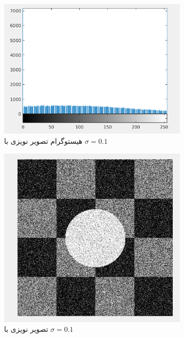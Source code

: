 \documentclass[11.5pt,a4paper]{article}
\begin{document}
\begin{figure}[h]
	\begin{subfigure}{.3\textwidth}
		\includegraphics[scale=0.2]{Imgs/NB_S1_Hist.png}
		\caption{هیستوگرام تصویر نویزی با $\sigma=0.1$}
	\end{subfigure}
	\begin{subfigure}{.3\textwidth}
		\includegraphics[scale=0.2]{Imgs/NB_S1_In.png}
		\caption{تصویر نویزی با $\sigma=0.1$}
	\end{subfigure}
	\begin{subfigure}{.3\textwidth}

\end{subfigure}
\end{figure}
\end{document}
